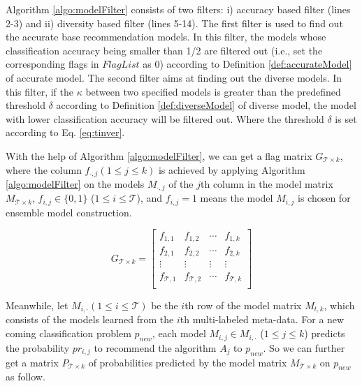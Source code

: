\documentclass[prodmode,acmtkdd]{acmsmall}
\begin{document}
Algorithm \ref{algo:modelFilter} consists of two filters: i)
accuracy based filter (lines 2-3) and ii) diversity based filter
(lines 5-14). The first filter is used to find out the accurate base
recommendation models. In this filter, the models whose
classification accuracy being smaller than 1/2 are filtered out
(i.e., set the corresponding flags in $FlagList$ as 0) according to
Definition \ref{def:accurateModel} of accurate model. The second
filter aims at finding out the diverse models. In this filter, if
the $\kappa$ between two specified models is greater than the
predefined threshold $\delta$ according to Definition
\ref{def:diverseModel} of diverse model, the model with lower
classification accuracy will be filtered out. Where the threshold
$\delta$ is set according to Eq. \ref{eq:tinver}.

With the help of Algorithm \ref{algo:modelFilter}, we can get a flag
matrix $G_{\mathcal{T}\times k}$, where the column $f_{\cdot,j} (1\leq j\leq
k)$ is achieved by applying Algorithm \ref{algo:modelFilter} on the
models $M_{\cdot, j}$ of the $j$th column in the model matrix
$M_{\mathcal{T}\times k}$, $f_{i,j} \in \{0,1\}$ ($1\leq i\leq \mathcal{T}$), and
$f_{i,j} = 1$ means the model $M_{i,j}$ is chosen for ensemble model
construction.

\begin{equation}
    G_{\mathcal{T}\times k} =\left[
  \begin{array}{cccc}
    f_{1,1} & f_{1,2} & \cdots & f_{1,k} \\
    f_{2,1} & f_{2,2} & \cdots & f_{2,k} \\
    \vdots & \vdots &  \vdots & \vdots \\
    f_{\mathcal{T},1} & f_{\mathcal{T},2} & \cdots & f_{\mathcal{T},k} \\
  \end{array}
    \right]
\end{equation}

Meanwhile, let $M_{i,\cdot} (1\leq i\leq \mathcal{T})$ be the $i$th row of the
model matrix $M_{t,k}$, which consists of the models learned from
the $i$th multi-labeled meta-data. For a new coming classification
problem $p_{new}$, each model $M_{i,j} \in M_{i,\cdot}$ ($1\leq
j\leq k$) predicts the probability $pr_{i,j}$ to recommend the
algorithm $A_j$ to $p_{new}$. So we can further get a matrix
$P_{\mathcal{T}\times k}$ of probabilities predicted by the model matrix
$M_{\mathcal{T}\times k}$ on $p_{new}$ as follow.
\end{document}
